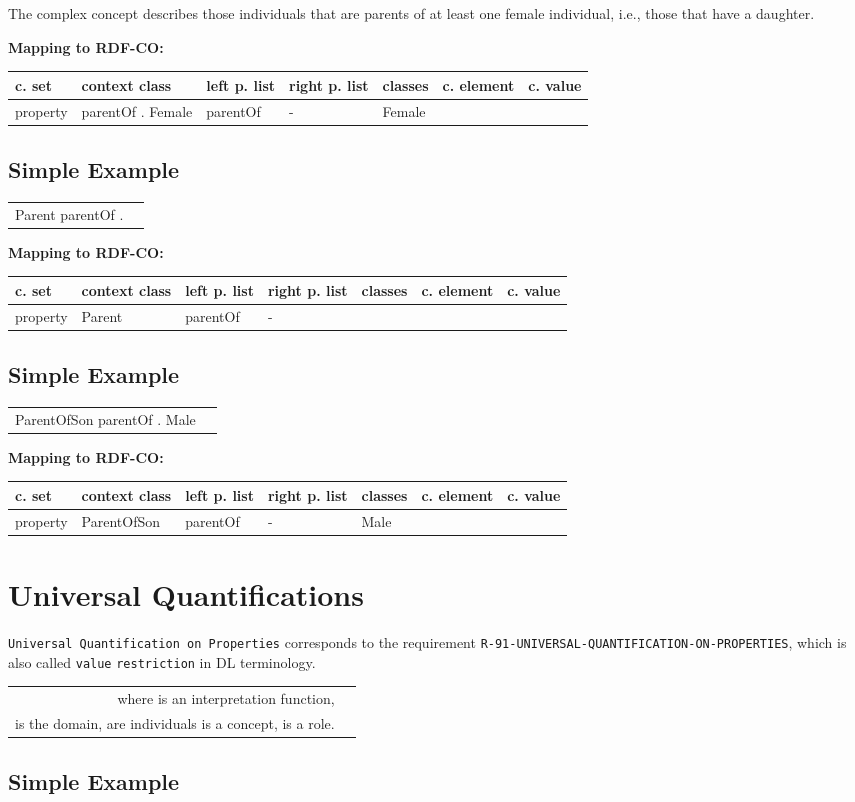 \documentclass{llncs}
\newcommand{\ms}[1]{\texttt{#1}}
\newenvironment{gcotable}{
  \scriptsize
  \sffamily
  \vspace{0cm}
	\begin{center}
	\textbf{\vspace{0.4cm}Mapping to RDF-CO:} \\
  \begin{tabular}{l|l|l|l|l|l|l}
	\hline
  \textbf{c. set} & \textbf{context class} & \textbf{left p. list} & \textbf{right p. list} & \textbf{classes} & \textbf{c. element} & \textbf{c. value} \\
  \hline

}{
  \hline
  \end{tabular}
	\end{center}
}
\newenvironment{DL}{
\vspace{0cm}
	\begin{center}
  \begin{tabular}{r l}

}{
  \end{tabular}
	\end{center}
}
\begin{document}
The complex concept describes those individuals that are parents of at least one
female individual, i.e., those that have a daughter.

\begin{gcotable}
property &  parentOf . Female & parentOf & - & Female &  \\
\end{gcotable}

\subsection{Simple Example}

\begin{DL}
Parent   parentOf . 
\end{DL}

\begin{gcotable}
property & Parent & parentOf & - &  &  \\
\end{gcotable}

\subsection{Simple Example}

\begin{DL}
ParentOfSon   parentOf . Male
\end{DL}

\begin{gcotable}
property & ParentOfSon & parentOf & - & Male &  \\
\end{gcotable}

\section{Universal Quantifications}

\ms{Universal Quantification on Properties} corresponds to the requirement \ms{R-91-UNIVERSAL-QUANTIFICATION-ON-PROPERTIES}, 
which is also called \ms{value} \ms{restriction} in DL terminology.

\begin{center}
\begin{DL} 
 where  is an interpretation function, \\
 is the domain,  are individuals  is a concept,  is a role. 
\end{DL}
\end{center}

\subsection{Simple Example}
\end{document}
